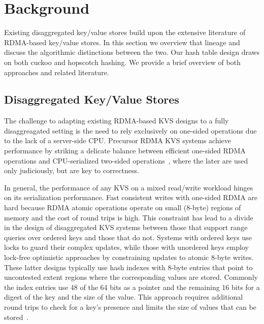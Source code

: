
\section{Background}
\label{sec:background}

Existing disaggregated key/value stores build upon the extensive literature of
RDMA-based key/value stores. In this section we overview that lineage and discuss the algorithmic
distinctions between the two. Our hash table design draws on both cuckoo and hopscotch hashing. We
provide a brief overview of both approaches and related literature.



\subsection{Disaggregated Key/Value Stores}

The challenge to adapting existing RDMA-based KVS designs to a fully
disaggreagated setting is the need to rely exclusively on one-sided
operations due to the lack of a server-side CPU.  Precursor RDMA KVS
systems achieve performance by striking a delicate balance between
efficient one-sided RDMA operations and CPU-serialized two-sided
operations~\cite{farm,herd,pilaf,cell,storm}, where the later are used
only judiciously, but are key to correctness.

In general, the performance of any KVS on a mixed read/write workload
hinges on its serialization performance.  Fast consistent writes with
one-sided RDMA are hard because RDMA atomic operations operate on
small (8-byte) regions of memory and the cost of round trips is
high. This constraint has lead to a divide in the design of
disaggregated KVS systems between those that support range queries over
ordered keys and those that do not. Systems with ordered keys use
locks to guard their complex updates, while those
with unordered keys employ lock-free optimistic approaches by
constraining updates to atomic 8-byte writes. These latter designs
typically use hash indexes with 8-byte entries that point to
uncontested extent regions where the corresponding values are stored.
Commonly the index entries use 48 of the 64 bits as a pointer and the
remaining 16 bits for a digest of the key and the size of the value.
This approach requires additional round trips to check for a key's
presence and limits the size of values that can be
stored~\cite{fusee,race}.

